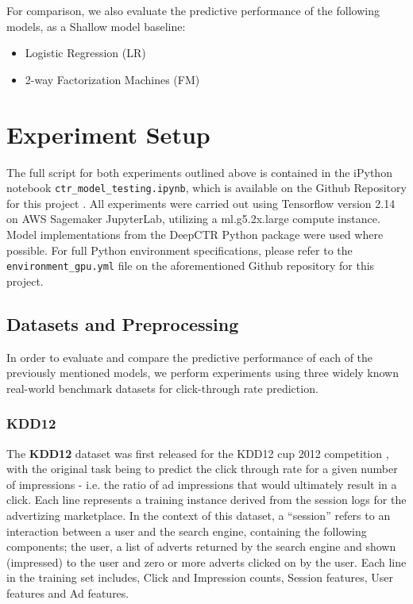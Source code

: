 \documentclass{mldsmsc}
\begin{document}
For comparison, we also evaluate the predictive performance of the following models, as a Shallow model baseline:

\begin{itemize}
    \item Logistic Regression (LR) \citep{RefWorks:richardson2007predicting}
    \item 2-way Factorization Machines (FM) \citep{RefWorks:rendle2010factorization}
\end{itemize}

\section{Experiment Setup}
\label{sec:experiment-setup}

The full script for both experiments outlined above is contained in the iPython notebook
\verb|ctr_model_testing.ipynb|, which is available on the Github Repository for this project \citep{Batek_Deep_Reinforcement_Leaning_2024}.
All experiments were carried out using Tensorflow version 2.14 on AWS Sagemaker JupyterLab, utilizing a ml.g5.2x.large compute instance.
Model implementations from the DeepCTR Python package \citep{RefWorks:shen2017deepctr:} were
used where possible. For full Python environment specifications, please refer to the
\verb|environment_gpu.yml| file on the aforementioned Github repository for this project.

\subsection{Datasets and Preprocessing}

In order to evaluate and compare the predictive performance of each of the previously mentioned
models, we perform experiments using three widely known real-world benchmark datasets for
click-through rate prediction.

\subsubsection{KDD12}

The \textbf{KDD12} dataset was first released for the KDD12 cup 2012 competition
\citep{RefWorks:aden2012kdd}, with the original task being to predict the 
click through rate for a given number of impressions - i.e. the ratio of ad impressions
that would ultimately result in a click. Each line represents 
a training instance derived from the session logs for the advertizing 
marketplace. In the context of this dataset, a ``session'' refers to an 
interaction between a user and the search engine, containing the following 
components; the user, a list of adverts returned by the search engine and 
shown (impressed) to the user and zero or more adverts clicked on by the 
user. Each line in the training set includes, Click and Impression counts, 
Session features, User features and Ad features.
\end{document}
